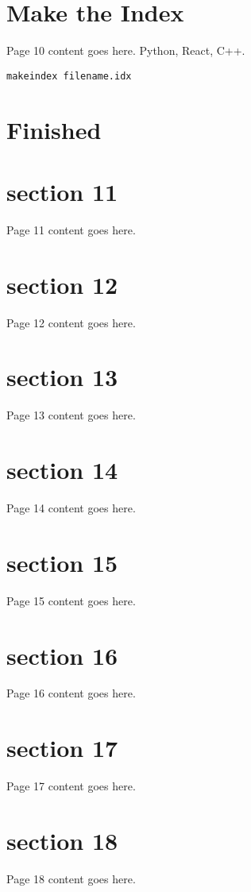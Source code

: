 \documentclass{article}
\begin{document}
\newpage

\section{Make the Index}
Page 10 content goes here.
Python, React, C++.


\texttt{makeindex filename.idx}


\newpage

\section{Finished}


\newpage

\section{section 11}
Page 11 content goes here.
\newpage

\section{section 12}
Page 12 content goes here.
\newpage

\section{section 13}
Page 13 content goes here.
\newpage

\section{section 14}
Page 14 content goes here.
\newpage

\section{section 15}
Page 15 content goes here.
\newpage

\section{section 16}
Page 16 content goes here.
\newpage

\section{section 17}
Page 17 content goes here.
\newpage

\section{section 18}
Page 18 content goes here.
\newpage
\end{document}
